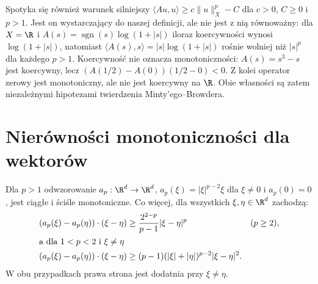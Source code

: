 \begin{uwaga}
Spotyka się również warunek silniejszy
$\langle Au,u\rangle\ge c\|u\|_X^p-C$ dla
$c>0$, $C\ge0$ i $p>1$.
Jest on wystarczający do naszej definicji, ale nie jest z nią
równoważny: dla $X=\R$ i $A(s)=\operatorname{sgn}(s)
\log(1+|s|)$ iloraz koercywności wynosi $\log(1+|s|)$,
natomiast $\langle A(s),s\rangle=|s|\log(1+|s|)$
rośnie wolniej niż $|s|^p$ dla każdego $p>1$.
Koercywność nie oznacza monotoniczności:
$A(s)=s^3-s$ jest koercywny, lecz
$(A(1/2)-A(0))(1/2-0)<0$.
Z kolei operator zerowy jest monotoniczny, ale nie
jest koercywny na $\R$. Obie własności są zatem
niezależnymi hipotezami twierdzenia Minty'ego--Browdera.
\end{uwaga}

\section{Nierówności monotoniczności dla wektorów}
\begin{lemat}\label{lem:pde26-vector}
Dla $p>1$ odwzorowanie $a_p:\R^d\to\R^d$,
$a_p(\xi)=|\xi|^{p-2}\xi$ dla $\xi\ne0$ i $a_p(0)=0$,
jest ciągłe i ściśle monotoniczne. Co więcej,
dla wszystkich $\xi,\eta\in\R^d$ zachodzą:
\begin{align}
 (a_p(\xi)-a_p(\eta))\cdot(\xi-\eta)
 &\ge \frac{2^{2-p}}{p-1}|\xi-\eta|^p &&(p\ge2),\label{eq:pde26-strong}\\
\intertext{a dla $1<p<2$ i $\xi\ne\eta$}
 (a_p(\xi)-a_p(\eta))\cdot(\xi-\eta)
 &\ge(p-1)(|\xi|+|\eta|)^{p-2}|\xi-\eta|^2.\label{eq:pde26-subquad}
\end{align}
W obu przypadkach prawa strona jest dodatnia przy $\xi\ne\eta$.
\end{lemat}
